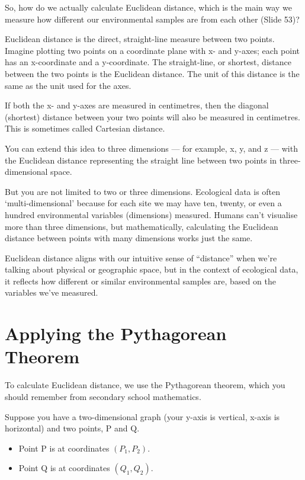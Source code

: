 \documentclass[
  11pt,
]{book}
\providecommand{\tightlist}{%
  \setlength{\itemsep}{0pt}\setlength{\parskip}{0pt}}
\begin{document}
So, how do we actually calculate Euclidean distance, which is the main
way we measure how different our environmental samples are from each
other (Slide 53)?

Euclidean distance is the direct, straight-line measure between two
points. Imagine plotting two points on a coordinate plane with x- and
y-axes; each point has an x-coordinate and a y-coordinate. The
straight-line, or shortest, distance between the two points is the
Euclidean distance. The unit of this distance is the same as the unit
used for the axes.

If both the x- and y-axes are measured in centimetres, then the diagonal
(shortest) distance between your two points will also be measured in
centimetres. This is sometimes called Cartesian distance.

You can extend this idea to three dimensions --- for example, x, y, and
z --- with the Euclidean distance representing the straight line between
two points in three-dimensional space.

But you are not limited to two or three dimensions. Ecological data is
often `multi-dimensional' because for each site we may have ten, twenty,
or even a hundred environmental variables (dimensions) measured. Humans
can't visualise more than three dimensions, but mathematically,
calculating the Euclidean distance between points with many dimensions
works just the same.

Euclidean distance aligns with our intuitive sense of ``distance'' when
we're talking about physical or geographic space, but in the context of
ecological data, it reflects how different or similar environmental
samples are, based on the variables we've measured.

\section{Applying the Pythagorean
Theorem}\label{applying-the-pythagorean-theorem}

To calculate Euclidean distance, we use the Pythagorean theorem, which
you should remember from secondary school mathematics.

Suppose you have a two-dimensional graph (your y-axis is vertical,
x-axis is horizontal) and two points, P and Q.

\begin{itemize}
\tightlist
\item
  Point P is at coordinates \((P_1, P_2)\).
\item
  Point Q is at coordinates \((Q_1, Q_2)\).
\end{itemize}
\end{document}

